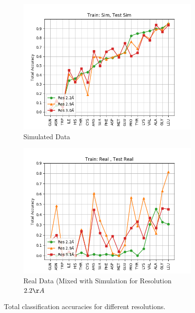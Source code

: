 \begin{figure}[!ht]
\begin{minipage}[b]{0.45\linewidth}
\begin{subfigure}[b]{\linewidth}
	\includegraphics[width=1.1\textwidth]{pics/s3_293_acc}
	\caption{Simulated Data \newline \newline}
	\label{f:s3_293_acc}
\end{subfigure}
\end{minipage}
\begin{minipage}[b]{0.45\linewidth}
\begin{subfigure}[b]{\linewidth}
	\includegraphics[width=1.1\textwidth]{pics/r3_293_acc}
	\caption{Real Data (Mixed with Simulation for Resolution $2.2 \AA$}
	\label{f:r3_293_acc}
\end{subfigure}
\end{minipage}
\caption{Total classification accuracies for different resolutions.}
\end{figure}


